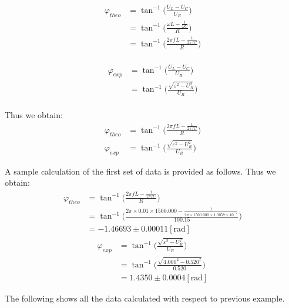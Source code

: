 \documentclass[a4paper]{article}
\begin{document}
\begin{align*}
	\varphi_{theo}
	 & = \tan^{-1}\bigg(\frac{U_L-U_C}{U_R}\bigg)                      \\
	 & = \tan^{-1} \bigg(\frac{\omega L - \frac{1}{\omega C}}{R}\bigg) \\
	 & = \tan^{-1}\bigg(\frac{2\pi fL - \frac{1}{2\pi fC}}{R}\bigg)    \\
\end{align*}

\begin{align*}
	\varphi_{exp}
	 & = \tan^{-1}\bigg(\frac{U_L-U_C}{U_R}\bigg)                    \\
	 & = \tan^{-1}\bigg(\frac{\sqrt{\varepsilon^2-U_R^2}}{U_R}\bigg) \\
\end{align*}

Thus we obtain:
\begin{align}
	\varphi_{theo} & = \tan^{-1}\bigg(\frac{2\pi fL - \frac{1}{2\pi fC}}{R}\bigg)  \\
	\varphi_{exp}  & = \tan^{-1}\bigg(\frac{\sqrt{\varepsilon^2-U_R^2}}{U_R}\bigg)
\end{align}

A sample calculation of the first set of data is provided as follows.
Thus we obtain:
\begin{align*}
	\varphi_{theo}
	 & = \tan^{-1}\bigg(\frac{2\pi fL - \frac{1}{2\pi fC}}{R}\bigg)                                                                     \\
	 & = \tan^{-1}\bigg(\frac{2\pi\times 0.01\times 1500.000 - \frac{1}{2\pi \times 1500.000\times 1.0057\times 10^{-7}}}{100.15}\bigg) \\
	 & = -1.46693 \pm 0.00011 [\text{rad}]
\end{align*}
\begin{align*}
	\varphi_{exp}
	 & = \tan^{-1}\bigg(\frac{\sqrt{\varepsilon^2-U_R^2}}{U_R}\bigg) \\
	 & = \tan^{-1}\bigg(\frac{\sqrt{4.000^2-0.520^2}}{0.520}\bigg)   \\
	 & =1.4350 \pm 0.0004 [\text{rad}]
\end{align*}


The following shows all the data calculated with respect to previous example.
\end{document}
